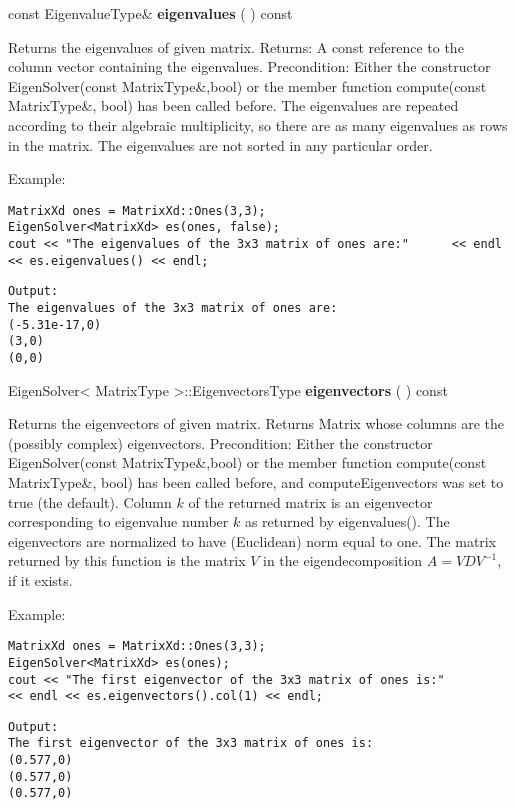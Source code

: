 \vspace{0.3cm}
const EigenvalueType\& \textbf{eigenvalues}  ( )  const 

Returns the eigenvalues of given matrix. 
Returns: A const reference to the column vector containing the eigenvalues.
Precondition: Either the constructor EigenSolver(const MatrixType\&,bool) or the member function compute(const MatrixType\&, bool) has been called before.
The eigenvalues are repeated according to their algebraic multiplicity, so there are as many eigenvalues as rows in the matrix. The eigenvalues are not sorted in any particular order.


Example:
\begin{lstlisting}
MatrixXd ones = MatrixXd::Ones(3,3);
EigenSolver<MatrixXd> es(ones, false);
cout << "The eigenvalues of the 3x3 matrix of ones are:"      << endl << es.eigenvalues() << endl;
\end{lstlisting}

\begin{verbatim}
Output:
The eigenvalues of the 3x3 matrix of ones are:
(-5.31e-17,0)
(3,0)
(0,0)

\end{verbatim}



\vspace{0.3cm}
EigenSolver< MatrixType >::EigenvectorsType \textbf{eigenvectors}  ( )  const 

Returns the eigenvectors of given matrix. 
Returns Matrix whose columns are the (possibly complex) eigenvectors.
Precondition: Either the constructor EigenSolver(const MatrixType\&,bool) or the member function compute(const MatrixType\&, bool) has been called before, and computeEigenvectors was set to true (the default).
Column $k$ of the returned matrix is an eigenvector corresponding to eigenvalue number $k$ as returned by eigenvalues(). The eigenvectors are normalized to have (Euclidean) norm equal to one. The matrix returned by this function is the matrix $V$ in the eigendecomposition $A = V D V^{-1}$, if it exists.


Example:
\begin{lstlisting}
MatrixXd ones = MatrixXd::Ones(3,3);
EigenSolver<MatrixXd> es(ones);
cout << "The first eigenvector of the 3x3 matrix of ones is:"      
<< endl << es.eigenvectors().col(1) << endl;
\end{lstlisting}

\begin{verbatim}		
Output:
The first eigenvector of the 3x3 matrix of ones is:
(0.577,0)
(0.577,0)
(0.577,0)
\end{verbatim}



